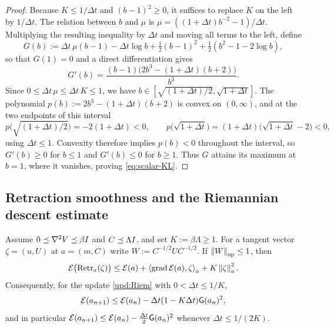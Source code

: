 \begin{proof}
    Because $K\leq1/\Delta t$ and $(b-1)^2\geq0$, it suffices to replace $K$ on the left by
    $1/\Delta t$. The relation between $b$ and $\mu$ is
    $\mu=((1+\Delta t)b^{-2}-1)/\Delta t$. Multiplying the resulting inequality by $\Delta t$
    and moving all terms to the left, define
    \begin{equation*}
        G(b):=\Delta t\,\mu(b-1)-\Delta t\log b+\tfrac12(b-1)^2+\tfrac12(b^2-1-2\log b),
    \end{equation*}
    so that $G(1)=0$ and a direct differentiation gives
    \begin{equation*}
        G'(b)=\frac{(b-1)\bigl(2b^3-(1+\Delta t)(b+2)\bigr)}{b^3}.
    \end{equation*}
    Since $0\leq\Delta t\,\mu\leq\Delta t\,K\leq1$, we have
    $b\in[\sqrt{(1+\Delta t)/2},\sqrt{1+\Delta t}]$. The polynomial
    $p(b):=2b^3-(1+\Delta t)(b+2)$ is convex on $(0,\infty)$, and at the two endpoints of this
    interval
    \begin{equation*}
        p\bigl(\sqrt{(1+\Delta t)/2}\bigr)=-2(1+\Delta t)<0,
        \qquad
        p\bigl(\sqrt{1+\Delta t}\bigr)=(1+\Delta t)\bigl(\sqrt{1+\Delta t}-2\bigr)<0,
    \end{equation*}
    using $\Delta t\leq1$. Convexity therefore implies $p(b)<0$ throughout the interval, so
    $G'(b)\geq0$ for $b\leq1$ and $G'(b)\leq0$ for $b\geq1$. Thus $G$ attains its maximum at
    $b=1$, where it vanishes, proving \eqref{eq:scalar-KL}.
\end{proof}

\subsection{Retraction smoothness and the Riemannian descent estimate}

\begin{lemma}\label{lem:descent-Riem}
    Assume $0\preceq\nabla^2V\preceq\beta I$ and $C\preceq\Lambda I$, and set
    $K:=\beta\Lambda\geq1$. For a tangent vector $\zeta=(u,U)$ at $a=(m,C)$ write
    $W:=C^{-1/2}UC^{-1/2}$. If $\left\lVert W\right\rVert_{\mathrm{op}}\leq1$, then
    \begin{equation}\label{eq:Riem-retraction-smooth}
        \mathcal{E}\bigl(\operatorname{Retr}_a(\zeta)\bigr)
        \leq
        \mathcal{E}(a)+\left\langle \operatorname{grad}\mathcal{E}(a),\zeta\right\rangle_a+K\left\lVert \zeta\right\rVert_a^2 .
    \end{equation}
    Consequently, for the update \eqref{upd:Riem} with $0<\Delta t\leq1/K$,
    \begin{equation*}
        \mathcal{E}(a_{n+1})\leq\mathcal{E}(a_n)-\Delta t(1-K\Delta t)\mathsf{G}(a_n)^2,
    \end{equation*}
    and in particular $\mathcal{E}(a_{n+1})\leq\mathcal{E}(a_n)-\tfrac{\Delta t}2\mathsf{G}(a_n)^2$ whenever
    $\Delta t\leq1/(2K)$.
\end{lemma}

